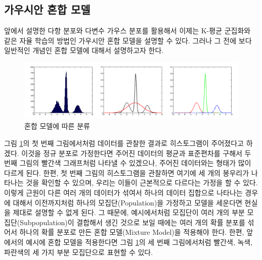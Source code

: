 \documentclass[a4paper]{oblivoir}
\begin{document}
\subsection{가우시안 혼합 모델}
앞에서 설명한 다항 분포와 다변수 가우스 분포를 활용해서 이제는 K-평균 군집화와 같은 자율 학습의 방법인 가우시안 혼합 모델을 설명할 수 있다. 그러나 그 전에 보다 일반적인 개념인 혼합 모델에 대해서 설명하고자 한다. \\

\begin{figure}[ht] \centering 
\includegraphics[scale=0.5]{fig8_9.png} 
\caption{혼합 모델에 따른 분류}
\label{fig:8-9}
\end{figure} 

그림 \ref{fig:8-9}의 첫 번째 그림에서처럼 데이터를 관찰한 결과로 히스토그램이 주어졌다고 하겠다. 이것을 정규 분포로 가정한다면 주어진 데이터의 평균과 표준편차를 구해서 두 번째 그림의 빨간색 그래프처럼 나타낼 수 있겠으나, 주어진 데이터와는 형태가 많이 다르게 된다. 한편, 첫 번째 그림의 히스토그램을 관찰하면 여기에 세 개의 봉우리가 나타나는 것을 확인할 수 있으며, 우리는 이들이 근본적으로 다르다는 가정을 할 수 있다. 이렇게 근원이 다른 여러 개의 데이터가 섞여서 하나의 데이터 집합으로 나타나는 경우에 대해서 이전까지처럼 하나의 모집단(Population)을 가정하고 모델을 세운다면 현실을 제대로 설명할 수 없게 된다. 그 때문에, 예시에서처럼 모집단이 여러 개의 부분 모집단(Subpopulation)이 결합해서 생긴 것으로 보일 때에는 여러 개의 확률 분포를 섞어서 하나의 확률 분포로 만든 혼합 모델(Mixture Model)을 적용해야 한다. 한편, 앞에서의 예시에 혼합 모델을 적용한다면 그림 \ref{fig:8-9}의 세 번째 그림에서처럼 빨간색, 녹색, 파란색의 세 가지 부분 모집단으로 표현할 수 있다. \\
\end{document}
